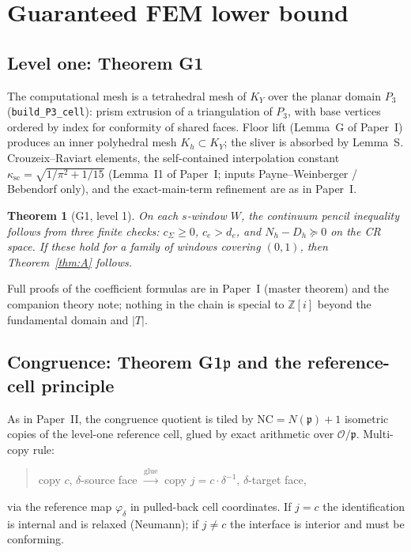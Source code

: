 \documentclass[11pt]{amsart}
\newtheorem{theorem}{Theorem}[section]
\newcommand{\ZZ}{\mathbb{Z}}
\newcommand{\p}{\mathfrak{p}}
\begin{document}
\section{Guaranteed FEM lower bound}\label{sec:G1}

\subsection{Level one: Theorem G1}

The computational mesh is a tetrahedral mesh of $K_Y$ over the planar
domain $P_3$ (\texttt{build\_P3\_cell}): prism extrusion of a triangulation
of $P_3$, with base vertices ordered by index for conformity of shared
faces.  Floor lift (Lemma~G of Paper~I) produces an inner polyhedral mesh
$K_h\subset K_Y$; the sliver is absorbed by Lemma~S.  Crouzeix--Raviart
elements, the self-contained interpolation constant
$\kappa_{\mathrm{sc}}=\sqrt{1/\pi^2+1/15}$ (Lemma~I1 of Paper~I; inputs
Payne--Weinberger / Bebendorf only), and the exact-main-term refinement
are as in Paper~I.

\begin{theorem}[G1, level 1]\label{thm:G1}
On each $s$-window $W$, the continuum pencil inequality follows from
three finite checks: $c_\Sigma\ge 0$, $c_e>d_e$, and
$N_h-D_h\succeq 0$ on the CR space.  If these hold for a family of
windows covering $(0,1)$, then Theorem~\ref{thm:A} follows.
\end{theorem}

Full proofs of the coefficient formulas are in Paper~I (master theorem)
and the companion theory note; nothing in the chain is special to
$\ZZ[i]$ beyond the fundamental domain and $|T|$.

\subsection{Congruence: Theorem G1$\p$ and the reference-cell principle}

As in Paper~II, the congruence quotient is tiled by
$\mathrm{NC}=N(\p)+1$ isometric copies of the level-one reference cell,
glued by exact arithmetic over $\mathcal{O}/\p$.  Multi-copy rule:
\begin{quote}
copy $c$, $\delta$-source face
\;$\xrightarrow{\mathrm{glue}}$\;
copy $j=c\cdot\delta^{-1}$, $\delta$-target face,
\end{quote}
via the reference map $\varphi_\delta$ in pulled-back cell coordinates.
If $j=c$ the identification is internal and is relaxed (Neumann); if
$j\neq c$ the interface is interior and must be conforming.
\end{document}
